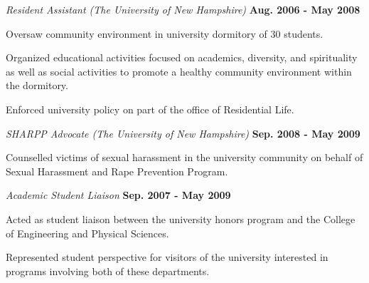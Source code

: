 \documentclass[10pt]{article}
\newenvironment{innerlist}[1][\enskip\textbullet]%
        {\begin{compactitem}[#1]}{\end{compactitem}}
\begin{document}
\begin{itemize}
\begin{innerlist}
    \end{innerlist}
\item[] \textit{Resident Assistant (The University of New Hampshire)}%
    \hfill \textbf{Aug. 2006 - May 2008}
    \begin{innerlist}
        \item Oversaw community environment in university dormitory of 30 students.
        \item Organized educational activities focused on academics, diversity, and spirituality as well as social activities to promote a healthy community environment within the dormitory.
        \item Enforced university policy on part of the office of Residential Life.
        \end{innerlist}
\item[] \textit{SHARPP Advocate (The University of New Hampshire)}%
    \hfill \textbf{Sep. 2008 - May 2009 }
    \begin{innerlist}
        \item Counselled victims of sexual harassment in the university community on behalf of Sexual Harassment and Rape Prevention Program.
    \end{innerlist}
\item[] \textit{Academic Student Liaison}%
    \hfill \textbf{Sep. 2007 - May 2009 }
    \begin{innerlist}
        \item Acted as student liaison between the university honors program and the College of Engineering and Physical Sciences.
        \item Represented student perspective for visitors of the university interested in programs involving both of these departments.
    \end{innerlist}
\end{itemize}
\end{document}
